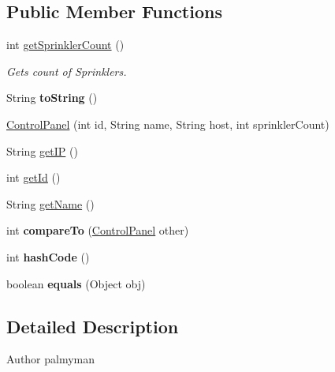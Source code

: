\subsection*{Public Member Functions}
\begin{DoxyCompactItemize}
\item 
int \hyperlink{classmodel_1_1ControlPanel_af7dc341ae82b57608823abae7c64097e}{get\-Sprinkler\-Count} ()
\begin{DoxyCompactList}\small\item\em Gets count of Sprinklers. \end{DoxyCompactList}\item 
\hypertarget{classmodel_1_1ControlPanel_aa4272fa40dd552125416bd9c9349dd66}{String {\bfseries to\-String} ()}\label{classmodel_1_1ControlPanel_aa4272fa40dd552125416bd9c9349dd66}

\item 
\hyperlink{classmodel_1_1ControlPanel_a43731580310f63277399f974fef7f3ec}{Control\-Panel} (int id, String name, String host, int sprinkler\-Count)
\item 
String \hyperlink{classmodel_1_1ControlPanel_a9bfa823323b666a53ff799d00c6e2919}{get\-I\-P} ()
\item 
int \hyperlink{classmodel_1_1ControlPanel_a2aa5b49b94ed6d3e26142ccb695586b9}{get\-Id} ()
\item 
String \hyperlink{classmodel_1_1ControlPanel_a35bf96becebe31e08e827614b4ac230a}{get\-Name} ()
\item 
\hypertarget{classmodel_1_1ControlPanel_afec852bfbbe6280b16f1da4dfcd6241c}{int {\bfseries compare\-To} (\hyperlink{classmodel_1_1ControlPanel}{Control\-Panel} other)}\label{classmodel_1_1ControlPanel_afec852bfbbe6280b16f1da4dfcd6241c}

\item 
\hypertarget{classmodel_1_1ControlPanel_a7d46efd572aa30bec5daf492130f99a2}{int {\bfseries hash\-Code} ()}\label{classmodel_1_1ControlPanel_a7d46efd572aa30bec5daf492130f99a2}

\item 
\hypertarget{classmodel_1_1ControlPanel_adf64cd0f8b0529baa0a0bcc5542a3d29}{boolean {\bfseries equals} (Object obj)}\label{classmodel_1_1ControlPanel_adf64cd0f8b0529baa0a0bcc5542a3d29}

\end{DoxyCompactItemize}


\subsection{Detailed Description}
\begin{DoxyAuthor}{Author}
palmyman 
\end{DoxyAuthor}


